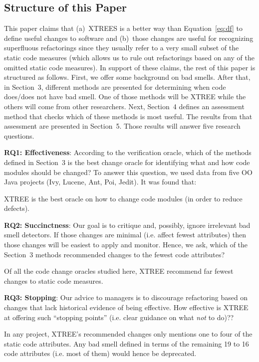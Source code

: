 \documentclass[twocolumn,5p]{elsarticle}
\newcommand{\eq}[1]{Equation~\ref{eq:#1}}
\theoremstyle{break}
\begin{document}
\subsection{Structure of this Paper}

This paper  claims that (a)~XTREES is a  better way than \eq{df}  to define useful changes to software and (b)~those changes are useful for recognizing   superfluous refactorings since they usually refer to a very 
small subset of the static code measures (which allows us to rule out refactorings based on any of the omitted
static code measures). 
In support of these claims, 
the rest of this paper is structured as follows. First, we offer some background on bad smells. After that,
  in Section~3, 
  different methods are presented for determining when code does/does not have bad smell. One of those methods
  will be XTREE while the others will come from other researchers. Next,    Section~4
  defines an assessment method that checks which of these methods is most useful. The results from that assessment 
  are presented in Section~5. Those results will answer five research questions.

 {\bf  RQ1: Effectiveness}: According to the verification oracle, which of the methods  defined in Section~3 is the best  change oracle for identifying what and how
  code modules should be changed? To answer this question, we used data from five OO Java projects
  (Ivy, Lucene, Ant, Poi, Jedit). It was found that:
  \begin{lesson}
 XTREE is the best oracle on how to change code modules (in order to reduce defects).
  \end{lesson}

 {\bf RQ2: Succinctness}: Our goal is to critique and, possibly,
ignore irrelevant bad smell detectors.  If those changes are minimal (i.e. affect fewest attributes) then those changes
will be easiest to apply and monitor. Hence, we ask, which of the Section~3 methods recommended changes to the fewest
code attributes?
\begin{lesson}
Of all the code change oracles studied here, XTREE recommend  far fewest changes to static code measures.
\end{lesson}

 {\bf RQ3: Stopping}: Our advice to managers is to discourage refactoring based on changes that lack
historical evidence of being effective. How effective is XTREE at offering such ``stopping points'' (i.e. clear guidance on what {\em not} to do)??
\begin{lesson}
In  any  project,  XTREE's  recommended  changes  only  mentions one to four 
of the  static code attributes.  Any bad smell defined in terms of the remaining 19 to 16 code attributes (i.e. most of them)
would hence be deprecated.
\end{lesson}
\end{document}
